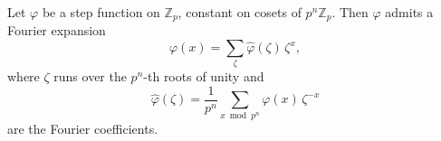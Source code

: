 Let $\varphi$ be a step function on $\mathbb{Z}_p$, constant on cosets of $p^n \mathbb{Z}_p$. Then $\varphi$ admits a Fourier expansion
$$
\varphi(x) = \sum_{\zeta} \widehat{\varphi}(\zeta) \, \zeta^x,
$$
where $\zeta$ runs over the $p^n$-th roots of unity and
$$
\widehat{\varphi}(\zeta) = \frac{1}{p^n} \sum_{x \bmod p^n} \varphi(x) \, \zeta^{-x}
$$
are the Fourier coefficients.
